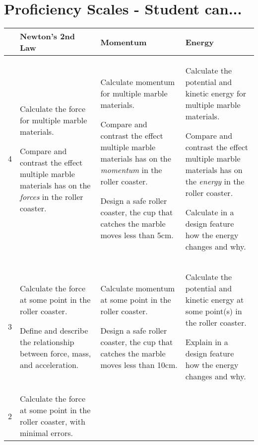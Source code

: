\documentclass[12pt, fleqn, paper=letter]{scrartcl}
\begin{document}
\section*{Proficiency Scales - Student can...}
\newcommand{\tablecolwidth}{55mm}
{\centering
\begin{tabular}{|c|p{\tablecolwidth}|p{\tablecolwidth}|p{\tablecolwidth}|}
\hline
  &\textbf{Newton's 2nd Law}
  &\textbf{Momentum}
  &\textbf{Energy}
\\\hline
4
	&Calculate the force for multiple marble materials.

	\vspace{2mm}
	Compare and contrast the effect multiple marble materials has on the \emph{forces} in the roller coaster.
	&Calculate momentum for multiple marble materials. 
	
	\vspace{2mm}
	Compare and contrast the effect multiple marble materials has on the \emph{momentum} in the roller coaster.

	\vspace{2mm}
	Design a safe roller coaster, the cup that catches the marble moves less than 5cm.
	&Calculate the potential and kinetic energy for multiple marble materials.
	
	\vspace{2mm}
	Compare and contrast the effect multiple marble materials has on the \emph{energy} in the roller coaster.
	
	\vspace{2mm}
	Calculate in a design feature how the energy changes and why.
\\\hline
3%
	&Calculate the force at some point in the roller coaster.

	\vspace{2mm}
	Define and describe the relationship between force, mass, and acceleration.
	&Calculate momentum at some point in the roller coaster. 
	
	\vspace{2mm}
	Design a safe roller coaster, the cup that catches the marble moves less than 10cm.
	&Calculate the potential and kinetic energy at some point(s) in the roller coaster.
	
	\vspace{2mm}
	Explain in a design feature how the energy changes and why.
\\\hline
2%
	&Calculate the force at some point in the roller coaster, with minimal errors.


\end{tabular}}
\end{document}
